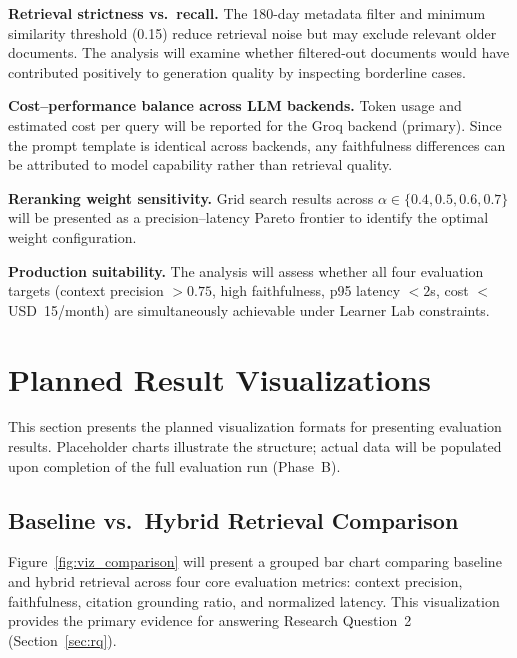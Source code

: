 \documentclass[12pt,a4paper]{report}
\begin{document}
\textbf{Retrieval strictness vs.\ recall.} The 180-day metadata filter and minimum similarity threshold (0.15) reduce retrieval noise but may exclude relevant older documents. The analysis will examine whether filtered-out documents would have contributed positively to generation quality by inspecting borderline cases.

\textbf{Cost--performance balance across LLM backends.} Token usage and estimated cost per query will be reported for the Groq backend (primary). Since the prompt template is identical across backends, any faithfulness differences can be attributed to model capability rather than retrieval quality.

\textbf{Reranking weight sensitivity.} Grid search results across $\alpha \in \{0.4, 0.5, 0.6, 0.7\}$ will be presented as a precision--latency Pareto frontier to identify the optimal weight configuration.

\textbf{Production suitability.} The analysis will assess whether all four evaluation targets (context precision $> 0.75$, high faithfulness, p95 latency $< 2$s, cost $<$ USD~15/month) are simultaneously achievable under Learner Lab constraints.

\section{Planned Result Visualizations}
\label{sec:visualizations}

This section presents the planned visualization formats for presenting evaluation results. Placeholder charts illustrate the structure; actual data will be populated upon completion of the full evaluation run (Phase~B).

\subsection{Baseline vs.\ Hybrid Retrieval Comparison}

Figure~\ref{fig:viz_comparison} will present a grouped bar chart comparing baseline and hybrid retrieval across four core evaluation metrics: context precision, faithfulness, citation grounding ratio, and normalized latency. This visualization provides the primary evidence for answering Research Question~2 (Section~\ref{sec:rq}).
\end{document}
